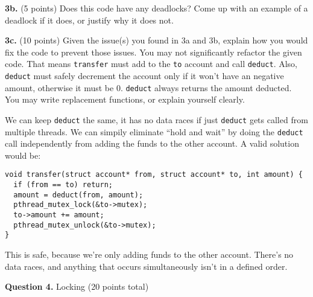 \documentclass[12pt]{article}
\begin{document}
\newpage

\textbf{3b.} (5 points)
Does this code have any deadlocks? Come up with an example of a deadlock if
it does, or justify why it does not.


\textbf{3c.} (10 points)
Given the issue(s) you found in 3a and 3b, explain how you would fix the code
to prevent those issues.
You may not significantly refactor the given code.
That means \texttt{transfer} must add to the \texttt{to} account and call
\texttt{deduct}.
Also, \texttt{deduct} must safely decrement the account only if it won't have
an negative amount, otherwise it must be 0.
\texttt{deduct} always returns the amount deducted.
You may write replacement functions, or explain yourself clearly.

  \vspace{1em}

  We can keep \texttt{deduct} the same, it has no data races if just
  \texttt{deduct} gets called from multiple threads.
  We can simpily eliminate ``hold and wait'' by doing the \texttt{deduct}
  call independently from adding the funds to the other account.
  A valid solution would be:

  \begin{lstlisting}
void transfer(struct account* from, struct account* to, int amount) {
  if (from == to) return;
  amount = deduct(from, amount);
  pthread_mutex_lock(&to->mutex);
  to->amount += amount;
  pthread_mutex_unlock(&to->mutex);
}
  \end{lstlisting}

  This is safe, because we're only adding funds to the other account.
  There's no data races, and anything that occurs simultaneously isn't in a
  defined order.

\newpage

\textbf{Question 4.} Locking (20 points total)
\end{document}
